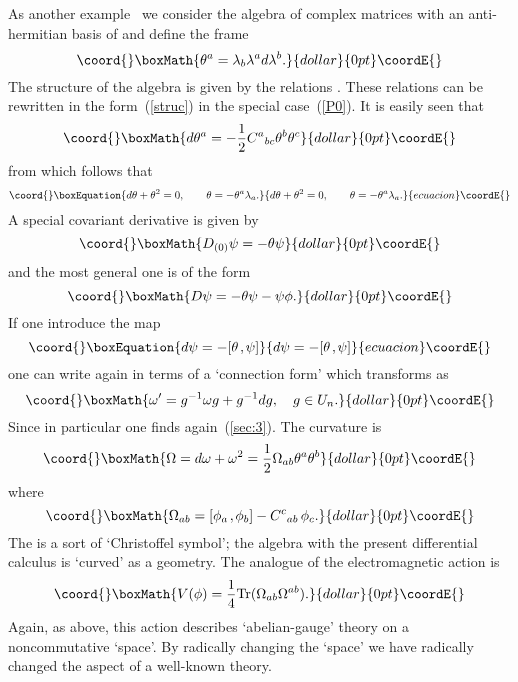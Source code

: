 \documentclass[a4paper,12pt]{article}
\def\tr{\mbox{Tr}}
\def\k{\kern-.1em\mathbin{,}\kern-.1em}
\begin{document}
As another example~\cite{DubKerMad89a,Mad89c} we consider the algebra
\coordHE{} of \coordHE{} complex matrices with an anti-hermitian basis
\coordHE{} of \coordHE{} and define the frame
$$\coord{}\boxMath{
\theta^a = \lambda_b \lambda^a d \lambda^b.
}{dollar}{0pt}\coordE{}$$
The structure of the algebra \coordHE{} is given by the relations
\coordHE{}. These relations can be rewritten
in the form~(\ref{struc}) in the special case~(\ref{P0}). It is
easily seen that
$$\coord{}\boxMath{
d \theta^a = - \frac 12 C^a{}_{bc} \theta^b \theta^c
}{dollar}{0pt}\coordE{}$$
from which follows that
\begin{equation}\coord{}\boxEquation{
d\theta + \theta^2 = 0,\qquad \theta = - \theta^a\lambda_a.  \label{3.1.14}
}{
d\theta + \theta^2 = 0,\qquad \theta = - \theta^a\lambda_a.  }{ecuacion}\coordE{}\end{equation}
A special covariant derivative is given by
$$\coord{}\boxMath{
D_{(0)}\psi = - \theta \psi
}{dollar}{0pt}\coordE{}$$
and the most general one is of the form 
$$\coord{}\boxMath{
D \psi = - \theta \psi - \psi \phi.
}{dollar}{0pt}\coordE{}$$
If one introduce the map
\begin{equation}\coord{}\boxEquation{
d\psi = - [\theta\k \psi]                                     \label{3.1.15}
}{
d\psi = - [\theta\k \psi]                                     }{ecuacion}\coordE{}\end{equation}
one can write again \coordHE{} in terms of a 
`connection form' \myHighlight{$\omega = \theta + \phi$}\coordHE{} which transforms as
$$\coord{}\boxMath{
\omega^\prime = g^{-1} \omega g + g^{-1} dg, \quad g \in U_n.
}{dollar}{0pt}\coordE{}$$
Since in particular \myHighlight{$\theta^\prime = \theta$}\coordHE{} one finds again~(\ref{sec:3}).
The curvature is
$$\coord{}\boxMath{
\Omega = d\omega + \omega^2 = 
\frac 12 \Omega_{ab} \theta^a \theta^b
}{dollar}{0pt}\coordE{}$$
where
$$\coord{}\boxMath{
\Omega_{ab} = [\phi_a\k\phi_b] - C^c{}_{ab}\,\phi_c.
}{dollar}{0pt}\coordE{}$$
The \coordHE{} is a sort of `Christoffel symbol'; the algebra \coordHE{}
with the present differential calculus is `curved' as a geometry. The
analogue of the electromagnetic action is
$$\coord{}\boxMath{
V(\phi) = \frac 14 \tr (\Omega_{ab} \Omega^{ab}).
}{dollar}{0pt}\coordE{}$$
Again, as above, this action describes `abelian-gauge' theory on a
noncommutative `space'. By radically changing the `space' we have
radically changed the aspect of a well-known theory. 
\end{document}
